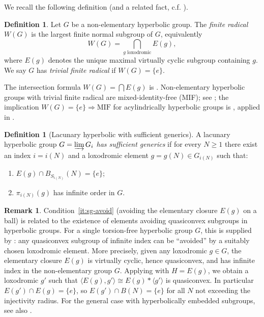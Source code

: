 \documentclass[12pt]{amsart}
\theoremstyle{plain}
\theoremstyle{definition}
\newtheorem{remark}[theorem]{Remark}
\newtheorem{definition}[theorem]{Definition}
\begin{document}
We recall the following definition (and a related fact, c.f. \cite{HullOsin}).

\begin{definition}\label{def:W}
Let $G$ be a non-elementary hyperbolic group.
The \emph{finite radical} $W(G)$ is the largest finite normal subgroup of $G$,
equivalently
\[
  W(G) = \bigcap_{\text{$g$ loxodromic}} E(g),
\]
where $E(g)$ denotes the unique maximal virtually cyclic subgroup containing $g$.
We say $G$ has \emph{trivial finite radical} if $W(G) = \{e\}$.
\end{definition}

The intersection formula $W(G)=\bigcap E(g)$ is \cite[Theorem~6.14]{DGO}. Non-elementary hyperbolic groups with trivial finite radical are
mixed-identity-free (MIF); see \cite[Lemma~3.3]{Jac}; the implication $W(G)=\{e\}\Rightarrow\text{MIF}$ for acylindrically hyperbolic groups is \cite[Corollary~1.7]{HullOsin}, applied in \cite[Lemma~3.3]{Jac}.



\begin{definition}[Lacunary hyperbolic with sufficient generics]\label{def:suff-generics}
A lacunary hyperbolic group $G = \varinjlim G_i$ \emph{has sufficient generics} if
for every $N \geq 1$ there exist an index $i = i(N)$ and a loxodromic element
$g = g(N) \in G_{i(N)}$ such that:
\begin{enumerate}[label=(\roman*)]
  \item\label{it:sg-avoid} $E(g) \cap B_{S_{i(N)}}(N) = \{e\}$;
  \item\label{it:sg-inf} $\pi_{i(N)}(g)$ has infinite order in $G$.
\end{enumerate}
\end{definition}

\begin{remark}
Condition~\ref{it:sg-avoid} (avoiding the elementary closure $E(g)$ on a ball)
is related to the existence of elements avoiding quasiconvex subgroups in hyperbolic
groups. For a single torsion-free hyperbolic group $G$, this is supplied by
\cite[Theorem~1]{Arz01}: any quasiconvex subgroup of infinite index can be
``avoided'' by a suitably chosen loxodromic element.
More precisely, given any loxodromic $g \in G$, the elementary closure $E(g)$ is
virtually cyclic, hence quasiconvex, and has infinite index in the non-elementary
group $G$.
Applying \cite[Theorem~1]{Arz01} with $H = E(g)$, we obtain a loxodromic $g'$ such
that $\langle E(g), g' \rangle \cong E(g) * \langle g' \rangle$ is quasiconvex.
In particular $E(g') \cap E(g) = \{e\}$, so $E(g') \cap B(N) = \{e\}$ for all
$N$ not exceeding the injectivity radius.
For the general case with hyperbolically embedded subgroups, see also
\cite[Corollary~6.12]{DGO}.
\end{remark}
\end{document}
